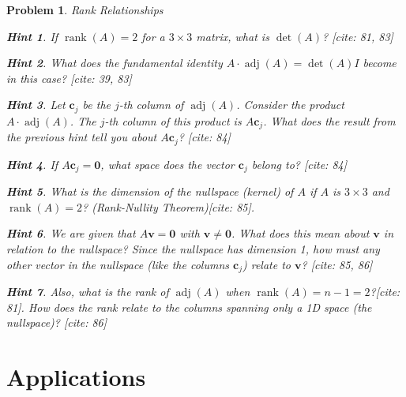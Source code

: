 \documentclass[12pt]{article}
\newtheorem{problem}{Problem}[section]
\theoremstyle{definition}
\newtheorem{hint}{Hint}[question]
\newcommand{\adj}{\operatorname{adj}}
\newcommand{\detm}{\operatorname{det}}
\newcommand{\rank}{\operatorname{rank}}
\begin{document}
\begin{problem}{Rank Relationships}
        \begin{hint}
            If $\rank(A)=2$ for a $3 \times 3$ matrix, what is $\detm(A)$? [cite: 81, 83]
        \end{hint}
        \begin{hint}
            What does the fundamental identity $A \cdot \adj(A) = \detm(A) I$ become in this case? [cite: 39, 83]
        \end{hint}
        \begin{hint}
            Let $\mathbf{c}_j$ be the $j$-th column of $\adj(A)$. Consider the product $A \cdot \adj(A)$. The $j$-th column of this product is $A \mathbf{c}_j$. What does the result from the previous hint tell you about $A \mathbf{c}_j$? [cite: 84]
        \end{hint}
        \begin{hint}
            If $A \mathbf{c}_j = \mathbf{0}$, what space does the vector $\mathbf{c}_j$ belong to? [cite: 84]
        \end{hint}
        \begin{hint}
            What is the dimension of the nullspace (kernel) of $A$ if $A$ is $3 \times 3$ and $\rank(A)=2$? (Rank-Nullity Theorem)[cite: 85].
        \end{hint}
        \begin{hint}
            We are given that $A\mathbf{v} = \mathbf{0}$ with $\mathbf{v} \neq \mathbf{0}$. What does this mean about $\mathbf{v}$ in relation to the nullspace? Since the nullspace has dimension 1, how must any other vector in the nullspace (like the columns $\mathbf{c}_j$) relate to $\mathbf{v}$? [cite: 85, 86]
        \end{hint}
         \begin{hint}
             Also, what is the rank of $\adj(A)$ when $\rank(A)=n-1=2$?[cite: 81]. How does the rank relate to the columns spanning only a 1D space (the nullspace)? [cite: 86]
         \end{hint}
    
\end{problem}

\section{Applications}
\end{document}
